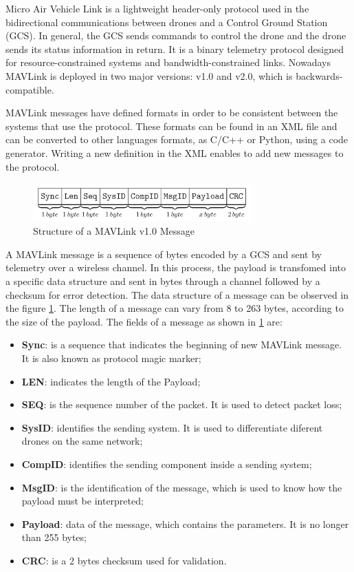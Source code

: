 Micro Air Vehicle Link is a lightweight header-only protocol used in the bidirectional communications between drones and a Control Ground Station (GCS). In general, the GCS sends commands to control the drone and the drone sends its status information in return. It is a binary telemetry protocol designed for resource-constrained systems and bandwidth-constrained links. Nowadays MAVLink is deployed in two major versions: v1.0 and v2.0, which is backwards-compatible. 

MAVLink messages have defined formats in order to be consistent between the systems that use the protocol. These formats can be found in an XML file and can be converted to other languages formats, as C/C++ or Python, using a code generator. Writing a new definition in the XML enables to add new messages to the protocol.

\begin{figure}[ht!]
\centering
\includegraphics[width=0.75\textwidth]{Cap2/fig_message_structure}
\caption{Structure of a MAVLink v1.0 Message}
\label{fig_message_structure}
\end{figure}

A MAVLink message is a sequence of bytes encoded by a GCS and sent by telemetry over a wireless channel. In this process, the payload is transfomed into a specific data structure and sent in bytes through a channel followed by a checksum for error detection. The data structure of a message can be observed in the figure \ref{fig_message_structure}. The length of a message can vary from 8 to 263 bytes, according to the size of the payload. The fields of a message as shown in \ref{fig_message_structure} are:

\begin{itemize}
\item \textbf{Sync}: is a sequence that indicates the beginning of new MAVLink message. It is also known as protocol magic marker; 
\item \textbf{LEN}: indicates the length of the Payload;
\item \textbf{SEQ}: is the sequence number of the packet. It is used to detect packet loss;
\item \textbf{SysID}: identifies the sending system. It is used to differentiate diferent drones on the same network;
\item \textbf{CompID}: identifies the sending component inside a sending system;
\item \textbf{MsgID}: is the identification of the message, which is used to know how the payload must be interpreted;
\item \textbf{Payload}: data of the message, which contains the parameters. It is no longer than 255 bytes; 
\item \textbf{CRC}: is a 2 bytes checksum used for validation.
\end{itemize}


